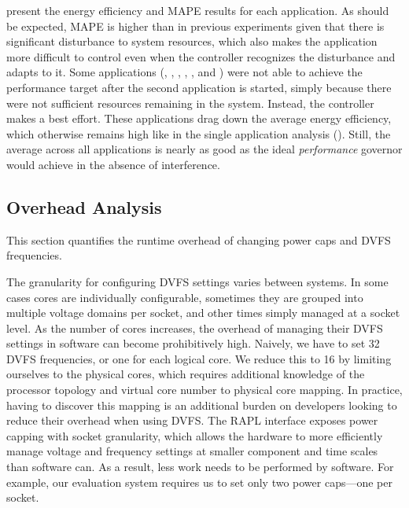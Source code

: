  present the energy efficiency and MAPE results for each application.
As should be expected, MAPE is higher than in previous experiments given that there is significant disturbance to system resources, which also makes the application more difficult to control even when the controller recognizes the disturbance and adapts to it.
Some applications (\eg {}, , , , , and ) were not able to achieve the performance target after the second application is started, simply because there were not sufficient resources remaining in the system.
Instead, the controller makes a best effort.
These applications drag down the average energy efficiency, which otherwise remains high like in the single application analysis (\eg {}).
Still, the average across all applications is nearly as good as the ideal \emph{performance} governor would achieve in the absence of interference.


\subsection{Overhead Analysis}
\label{sec:copper-eval-overhead}

This section quantifies the runtime overhead of changing power caps and DVFS frequencies.

The granularity for configuring DVFS settings varies between systems.
In some cases cores are individually configurable, sometimes they are grouped into multiple voltage domains per socket, and other times simply managed at a socket level.
As the number of cores increases, the overhead of managing their DVFS settings in software can become prohibitively high.
Naively, we have to set 32 DVFS frequencies, or one for each logical core.
We reduce this to 16 by limiting ourselves to the physical cores, which requires additional knowledge of the processor topology and virtual core number to physical core mapping.
In practice, having to discover this mapping is an additional burden on developers looking to reduce their overhead when using DVFS.
The RAPL interface exposes power capping with socket granularity, which allows the hardware to more efficiently manage voltage and frequency settings at smaller component and time scales than software can.
As a result, less work needs to be performed by software.
For example, our evaluation system requires us to set only two power caps---one per socket.

